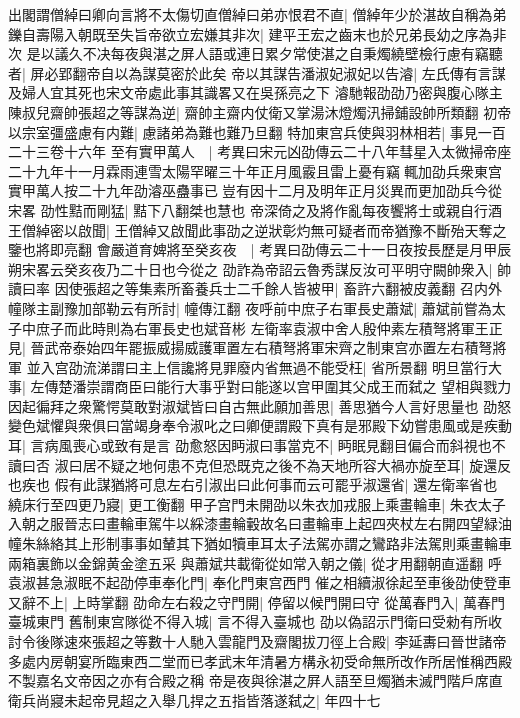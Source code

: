出閣謂僧綽曰卿向言將不太傷切直僧綽曰弟亦恨君不直|{
	僧綽年少於湛故自稱為弟}
鑠自壽陽入朝既至失旨帝欲立宏嫌其非次|{
	建平王宏之齒末也於兄弟長幼之序為非次}
是以議久不决每夜與湛之屏人語或連日累夕常使湛之自秉燭繞壁檢行慮有竊聽者|{
	屏必郢翻帝自以為謀莫密於此矣}
帝以其謀告潘淑妃淑妃以告濬|{
	左氏傳有言謀及婦人宜其死也宋文帝處此事其識畧又在吳孫亮之下}
濬馳報劭劭乃密與腹心隊主陳叔兒齋帥張超之等謀為逆|{
	齋帥主齋内仗衛又掌湯沐燈燭汛掃鋪設帥所類翻}
初帝以宗室彊盛慮有内難|{
	慮諸弟為難也難乃旦翻}
特加東宫兵使與羽林相若|{
	事見一百二十三卷十六年}
至有實甲萬人　|{
	考異曰宋元凶劭傳云二十八年彗星入太微掃帝座二十九年十一月霖雨連雪太陽罕曜三十年正月風霰且雷上憂有竊輒加劭兵衆東宫實甲萬人按二十九年劭濬巫蠱事已豈有因十二月及明年正月災異而更加劭兵今從宋畧}
劭性黠而剛猛|{
	黠下八翻桀也慧也}
帝深倚之及將作亂每夜饗將士或親自行酒王僧綽密以啟聞|{
	王僧綽又啟聞此事劭之逆狀彰灼無可疑者而帝猶豫不斷殆天奪之鑒也將即亮翻}
會嚴道育婢將至癸亥夜　|{
	考異曰劭傳云二十一日夜按長歷是月甲辰朔宋畧云癸亥夜乃二十日也今從之}
劭詐為帝詔云魯秀謀反汝可平明守闕帥衆入|{
	帥讀曰率}
因使張超之等集素所畜養兵士二千餘人皆被甲|{
	畜許六翻被皮義翻}
召内外幢隊主副豫加部勒云有所討|{
	幢傳江翻}
夜呼前中庶子右軍長史蕭斌|{
	蕭斌前嘗為太子中庶子而此時則為右軍長史也斌音彬}
左衛率袁淑中舍人殷仲素左積弩將軍王正見|{
	晉武帝泰始四年罷振威揚威護軍置左右積弩將軍宋齊之制東宫亦置左右積弩將軍}
並入宫劭流涕謂曰主上信讒將見罪廢内省無過不能受枉|{
	省所景翻}
明旦當行大事|{
	左傳楚潘崇謂商臣曰能行大事乎對曰能遂以宫甲圍其父成王而弑之}
望相與戮力因起徧拜之衆驚愕莫敢對淑斌皆曰自古無此願加善思|{
	善思猶今人言好思量也}
劭怒變色斌懼與衆俱曰當竭身奉令淑叱之曰卿便謂殿下真有是邪殿下幼嘗患風或是疾動耳|{
	言病風喪心或致有是言}
劭愈怒因眄淑曰事當克不|{
	眄眠見翻目偏合而斜視也不讀曰否}
淑曰居不疑之地何患不克但恐既克之後不為天地所容大禍亦旋至耳|{
	旋還反也疾也}
假有此謀猶將可息左右引淑出曰此何事而云可罷乎淑還省|{
	還左衛率省也}
繞床行至四更乃寢|{
	更工衡翻}
甲子宫門未開劭以朱衣加戎服上乘畫輪車|{
	朱衣太子入朝之服晉志曰畫輪車駕牛以綵漆畫輪轂故名曰畫輪車上起四夾杖左右開四望緑油幢朱絲絡其上形制事事如輦其下猶如犢車耳太子法駕亦謂之鸞路非法駕則乘畫輪車兩箱裏飾以金錦黄金塗五采}
與蕭斌共載衛從如常入朝之儀|{
	從才用翻朝直遥翻}
呼袁淑甚急淑眠不起劭停車奉化門|{
	奉化門東宫西門}
催之相續淑徐起至車後劭使登車又辭不上|{
	上時掌翻}
劭命左右殺之守門開|{
	停留以候門開曰守}
從萬春門入|{
	萬春門臺城東門}
舊制東宫隊從不得入城|{
	言不得入臺城也}
劭以偽詔示門衛曰受勑有所收討令後隊速來張超之等數十人馳入雲龍門及齋閣拔刀徑上合殿|{
	李延夀曰晉世諸帝多處内房朝宴所臨東西二堂而已孝武末年清暑方構永初受命無所改作所居惟稱西殿不製嘉名文帝因之亦有合殿之稱}
帝是夜與徐湛之屛人語至旦燭猶未滅門階戶席直衛兵尚寢未起帝見超之入舉几捍之五指皆落遂弑之|{
	年四十七}
